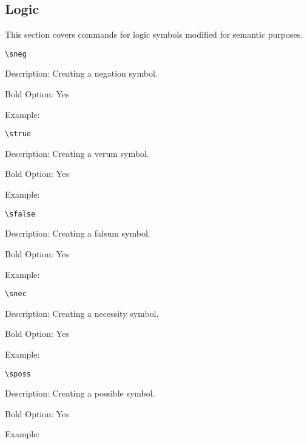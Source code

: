 \documentclass[10pt, a4paper]{article}
\newenvironment{itemizeexamplecommand}{
	\begin{itemize}
		\setlength\itemsep{-0.2em}
	}
	{
	\end{itemize}
}
\begin{document}
	\subsection{Logic}
	This section covers commands for logic symbols modified for semantic purposes.
	\pex\begin{itemizeexamplecommand}
		\item[] \begin{lstlisting}[style=B]
		\sneg
		\end{lstlisting}
		{\scriptsize
			\item[] Description: Creating a negation symbol.
			\item[] Bold Option: Yes
			\item[] Example: \sneg}
	\end{itemizeexamplecommand}
	\xe
	\pex\begin{itemizeexamplecommand}
		\item[] \begin{lstlisting}[style=B]
		\strue
		\end{lstlisting}
		{\scriptsize
			\item[] Description: Creating a verum symbol.
			\item[] Bold Option: Yes
			\item[] Example: \strue}
	\end{itemizeexamplecommand}
	\xe
	\pex\begin{itemizeexamplecommand}
		\item[] \begin{lstlisting}[style=B]
		\sfalse
		\end{lstlisting}
		{\scriptsize
			\item[] Description: Creating a falsum symbol.
			\item[] Bold Option: Yes
			\item[] Example: \sfalse}
	\end{itemizeexamplecommand}
	\xe
	\pex\begin{itemizeexamplecommand}
		\item[] \begin{lstlisting}[style=B]
		\snec
		\end{lstlisting}
		{\scriptsize
			\item[] Description: Creating a necessity symbol.
			\item[] Bold Option: Yes
			\item[] Example: \snec}
	\end{itemizeexamplecommand}
	\xe
	\pex\begin{itemizeexamplecommand}
		\item[] \begin{lstlisting}[style=B]
		\sposs
		\end{lstlisting}
		{\scriptsize
			\item[] Description: Creating a possible symbol.
			\item[] Bold Option: Yes
			\item[] Example: \sposs}
	\end{itemizeexamplecommand}
\end{document}
